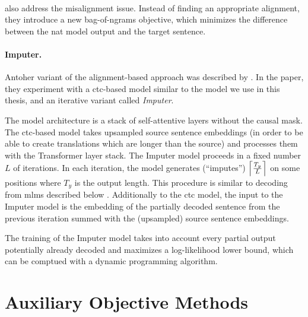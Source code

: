 \paragraph{} \citet{shao2020minimizing} also address the
misalignment issue. Instead of finding an appropriate alignment, they introduce
a new bag-of-ngrams objective, which minimizes the difference between the
\ac{nat} model output and the target sentence. 


\paragraph{Imputer.} Antoher variant of the alignment-based approach was
described by \citet{saharia-etal-2020-non}. In the paper, they experiment with
a \acs{ctc}-based model similar to the model we use in this thesis, and an
iterative variant called \emph{Imputer}.

The model architecture is a stack of self-attentive layers without the causal
mask. The \acs{ctc}-based model takes upsampled source sentence embeddings (in
order to be able to create translations which are longer than the source) and
processes them with the Transformer layer stack.  The Imputer model proceeds in
a fixed number $L$ of iterations. In each iteration, the model generates
(``imputes'') $\ceil*{\frac{T_y}{L}}$ on some positions where $T_y$ is the
output length. This procedure is similar to decoding from \aclp{mlm} described
below . Additionally to the \ac{ctc} model, the input to the
Imputer model is the embedding of the partially decoded sentence from the
previous iteration summed with the (upsampled) source sentence embeddings.

The training of the Imputer model takes into account every partial output
potentially already decoded and maximizes a log-likelihood lower bound, which
can be comptued with a dynamic programming algorithm. 



\section{Auxiliary Objective Methods}
\label{sec:nat:aux}



